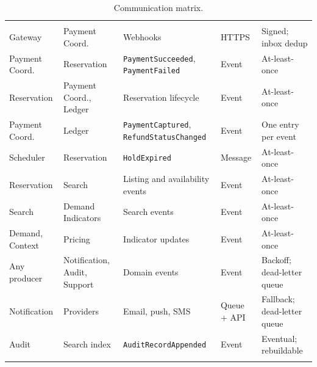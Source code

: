 \begin{longtable}{@{}L{2.5cm}L{2.5cm}L{3.9cm}L{1.6cm}L{2.6cm}@{}}
\addlinespace
{} \\
Gateway & Payment Coord. & Webhooks & HTTPS & Signed; inbox dedup \\
Payment Coord. & Reservation & \texttt{PaymentSucceeded},
  \texttt{PaymentFailed} & Event & At-least-once \\
Reservation & Payment Coord., Ledger & Reservation lifecycle & Event &
  At-least-once \\
Payment Coord. & Ledger & \texttt{PaymentCaptured},
  \texttt{Refund\allowbreak Status\allowbreak Changed} & Event & One entry per event \\
Scheduler & Reservation & \texttt{HoldExpired} & Message & At-least-once \\
Reservation & Search & Listing and availability events & Event &
  At-least-once \\
Search & Demand Indicators & Search events & Event & At-least-once \\
Demand, Context & Pricing & Indicator updates & Event & At-least-once \\
Any producer & Notification, Audit, Support & Domain events & Event &
  Backoff; dead-letter queue \\
Notification & Providers & Email, push, SMS & Queue + API & Fallback;
  dead-letter queue \\
Audit & Search index & \texttt{Audit\allowbreak Record\allowbreak Appended} & Event & Eventual;
  rebuildable \\
\bottomrule
\caption{Communication matrix.}
\label{tab:matrix}
\end{longtable}
